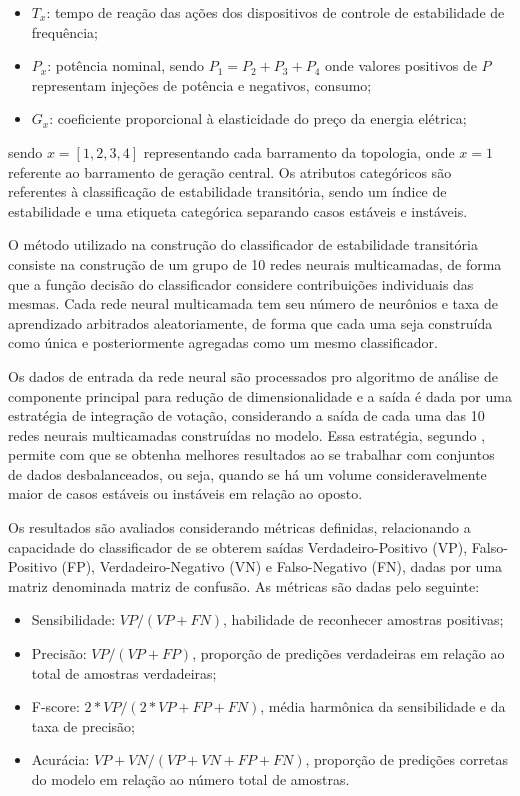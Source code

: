 \documentclass[12pt,oneside,a4paper,chapter=TITLE,section=TITLE,sumario=tradicional,english,brazil]{abntex2}
\begin{document}
\begin{itemize}
	\item $T_{x}$: tempo de reação das ações dos dispositivos de controle de estabilidade de frequência;
	\item $P_{x}$: potência nominal, sendo $P_{1}=P_{2}+P_{3}+P_{4}$ onde valores positivos de $P$ representam injeções de potência e negativos, consumo;
	\item $G_{x}$: coeficiente proporcional à elasticidade do preço da energia elétrica;
\end{itemize}
sendo $x=[1, 2, 3, 4]$ representando cada barramento da topologia, onde $x=1$ referente ao barramento de geração central. Os atributos categóricos são referentes à classificação de estabilidade transitória, sendo um índice de estabilidade e uma etiqueta categórica separando casos estáveis e instáveis.\par
O método utilizado na construção do classificador de estabilidade transitória consiste na construção de um grupo de 10 redes neurais multicamadas, de forma que a função decisão do classificador considere contribuições individuais das mesmas. Cada rede neural multicamada tem seu número de neurônios e taxa de aprendizado arbitrados aleatoriamente, de forma que cada uma seja construída como única e posteriormente agregadas como um mesmo classificador.\par 
Os dados de entrada da rede neural são processados pro algoritmo de análise de componente principal para redução de dimensionalidade e a saída é dada por uma estratégia de integração de votação, considerando a saída de cada uma das 10 redes neurais multicamadas construídas no modelo. Essa estratégia, segundo \textcite{zhang2021}, permite com que se obtenha melhores resultados ao se trabalhar com conjuntos de dados desbalanceados, ou seja, quando se há um volume consideravelmente maior de casos estáveis ou instáveis em relação ao oposto.\par 
Os resultados são avaliados considerando métricas definidas, relacionando a capacidade do classificador de se obterem saídas Verdadeiro-Positivo (VP), Falso-Positivo (FP), Verdadeiro-Negativo (VN) e Falso-Negativo (FN), dadas por uma matriz denominada matriz de confusão. As métricas são dadas pelo seguinte:
\begin{itemize}
\item Sensibilidade: $VP/(VP+FN)$, habilidade de reconhecer amostras positivas;
\item Precisão: $VP/(VP+FP)$, proporção de predições verdadeiras em relação ao total de amostras verdadeiras;
\item F-score: $2*VP/(2*VP+FP+FN)$, média harmônica da sensibilidade e da taxa de precisão;
\item Acurácia: $VP+VN/(VP+VN+FP+FN)$, proporção de predições corretas do modelo em relação ao número total de amostras.
\end{itemize}
\par
\end{document}
